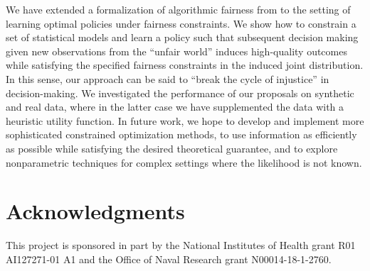 \documentclass{article}
\begin{document}
We have extended a formalization of algorithmic fairness from \citet{NabiShpitser18Fair} to the setting of learning optimal policies under fairness constraints.
We show how to constrain a set of statistical models and learn a policy such that
subsequent decision making given new observations from the ``unfair world'' induces high-quality outcomes while satisfying the specified fairness constraints in the induced joint distribution.  
In this sense, our approach can be said to ``break the cycle of injustice'' in decision-making.
We investigated the performance of our proposals on synthetic and real data, where in the latter case we have supplemented the data with a heuristic utility function. 
In future work, we hope to develop and implement more sophisticated constrained optimization methods, to use information as efficiently as possible while satisfying the desired theoretical guarantee, and to explore nonparametric techniques for complex settings where the likelihood is not known.



\clearpage

\section*{Acknowledgments}
This project is sponsored in part by the National Institutes of Health grant R01 AI127271-01 A1 and the Office of Naval Research grant N00014-18-1-2760. 

{\small



}
\end{document}
